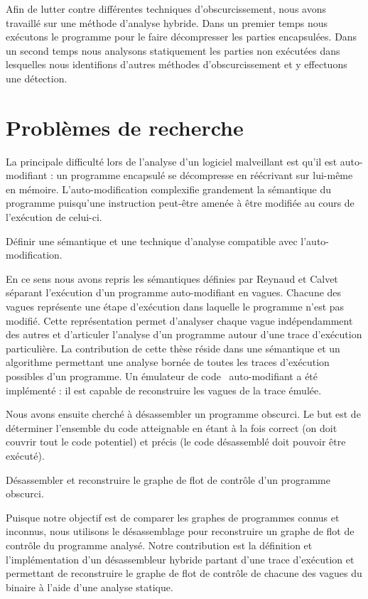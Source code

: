 Afin de lutter contre différentes techniques d'obscurcissement, nous avons travaillé sur une méthode d'analyse hybride.
Dans un premier temps nous exécutons le programme pour le faire décompresser les parties encapsulées. Dans un second temps nous analysons statiquement les parties non exécutées dans lesquelles nous identifions d'autres méthodes d'obscurcissement et y effectuons une détection.

\section{Problèmes de recherche}
La principale difficulté lors de l'analyse d'un logiciel malveillant est qu'il est auto-modifiant : un programme encapsulé se décompresse en réécrivant sur lui-même en mémoire. L'auto-modification complexifie grandement la sémantique du programme puisqu'une instruction peut-être amenée à être modifiée au cours de l'exécution de celui-ci.

\begin{pb}
 Définir une sémantique et une technique d'analyse compatible avec l'auto-modification.
\end{pb}

En ce sens nous avons repris les sémantiques définies par Reynaud et Calvet  séparant l'exécution d'un programme auto-modifiant en vagues. Chacune des vagues représente une étape d'exécution dans laquelle le programme n'est pas modifié. Cette représentation permet d'analyser chaque vague indépendamment des autres et d'articuler l'analyse d'un programme autour d'une trace d'exécution particulière.
La contribution de cette thèse réside dans une sémantique et un algorithme permettant une analyse bornée de toutes les traces d'exécution possibles d'un programme. Un émulateur de code \xq\ auto-modifiant a été implémenté : il est capable de reconstruire les vagues de la trace émulée.

Nous avons ensuite cherché à désassembler un programme obscurci. Le but est de déterminer l'ensemble du code atteignable en étant à la fois correct (on doit couvrir tout le code potentiel) et précis (le code désassemblé doit pouvoir être exécuté). 

\begin{pb}
 Désassembler et reconstruire le graphe de flot de contrôle d'un programme obscurci.
\end{pb}

Puisque notre objectif est de comparer les graphes de programmes connus et inconnus, nous utilisons le désassemblage pour reconstruire un graphe de flot de contrôle du programme analysé.
Notre contribution est la définition et l'implémentation d'un désassembleur hybride partant d'une trace d'exécution et permettant de reconstruire le graphe de flot de contrôle de chacune des vagues du binaire à l'aide d'une analyse statique.

